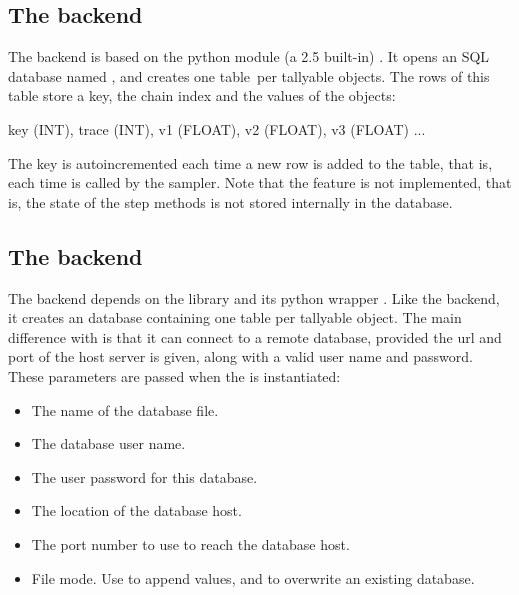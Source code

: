 \documentclass[]{jss}
\begin{document}

\subsection[sqlite]{The  backend}
  \label{sqlite}%


The  backend is based on the python module  
(a  2.5 built-in) . It opens an SQL database named ,
and creates one table~per tallyable objects. The rows of this table
store a key, the chain index and the values of the objects:
%
\begin{CodeInput}
key (INT), trace (INT),  v1 (FLOAT), v2 (FLOAT), v3 (FLOAT) ...    
\end{CodeInput}

The key is autoincremented each time a new row is added to the table,
that is, each time  is called by the sampler. Note that the
 feature is not implemented, that is, the state of the step
methods is not stored internally in the database.



\subsection[mysql]{The  backend}
  \label{mysql}%


The  backend depends on the  library and its python wrapper
 \citep{mysqldb}. Like the  backend, it creates an  database containing
one table per tallyable object. The main difference with
 is that it can connect to a remote database, provided the url and
port of the host server is given, along with a valid user name and password.
These parameters are passed when the  is instantiated:
%
\begin{itemize}

\item {} The name of the database file.
                    
\item {} The database user name.
                    
\item {} The user password for this database.
                    
\item {} The location of the database host.
                    
\item {} The port number to use to reach the database host.

\item {} File mode.  Use  to append values, and 
to overwrite an existing database.

\end{itemize}
\end{document}
